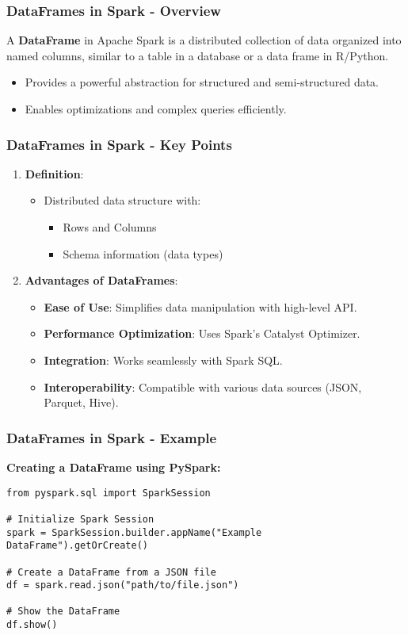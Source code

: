\documentclass[aspectratio=169]{beamer}
\begin{document}
\begin{frame}[fragile]
    \frametitle{DataFrames in Spark - Overview}
    A \textbf{DataFrame} in Apache Spark is a distributed collection of data organized into named columns, similar to a table in a database or a data frame in R/Python. 
    \begin{itemize}
        \item Provides a powerful abstraction for structured and semi-structured data.
        \item Enables optimizations and complex queries efficiently.
    \end{itemize}
\end{frame}

\begin{frame}[fragile]
    \frametitle{DataFrames in Spark - Key Points}
    \begin{enumerate}
        \item \textbf{Definition}:
            \begin{itemize}
                \item Distributed data structure with:
                    \begin{itemize}
                        \item Rows and Columns
                        \item Schema information (data types)
                    \end{itemize}
            \end{itemize}
        
        \item \textbf{Advantages of DataFrames}:
            \begin{itemize}
                \item \textbf{Ease of Use}: Simplifies data manipulation with high-level API.
                \item \textbf{Performance Optimization}: Uses Spark’s Catalyst Optimizer.
                \item \textbf{Integration}: Works seamlessly with Spark SQL.
                \item \textbf{Interoperability}: Compatible with various data sources (JSON, Parquet, Hive).
            \end{itemize}
    \end{enumerate}
\end{frame}

\begin{frame}[fragile]
    \frametitle{DataFrames in Spark - Example}
    \textbf{Creating a DataFrame using PySpark:}

    \begin{lstlisting}
from pyspark.sql import SparkSession

# Initialize Spark Session
spark = SparkSession.builder.appName("Example DataFrame").getOrCreate()

# Create a DataFrame from a JSON file
df = spark.read.json("path/to/file.json")

# Show the DataFrame
df.show()
    \end{lstlisting}
\end{frame}
\end{document}
